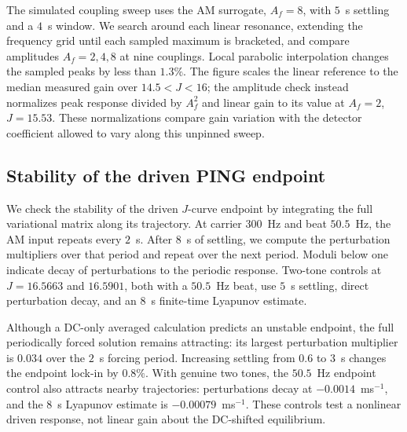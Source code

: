\documentclass[11pt,a4paper]{article}
\begin{document}
The simulated coupling sweep uses the AM surrogate, $A_f=8$, with $5$~s
settling and a $4$~s window. We search around each linear resonance, extending
the frequency grid until each sampled maximum is bracketed, and compare
amplitudes $A_f=2,4,8$ at nine couplings. Local parabolic interpolation changes
the sampled peaks by less than $1.3\%$. The figure scales the linear reference
to the median measured gain over $14.5<J<16$; the amplitude check instead
normalizes peak response divided by $A_f^2$ and linear gain to its value at
$A_f=2$, $J=15.53$. These normalizations compare gain variation with the detector coefficient
allowed to vary along this unpinned sweep.


\fi

\subsection{Stability of the driven PING endpoint}\label{app:ping-stability}
We check the stability of the driven $J$-curve endpoint by integrating the full
variational matrix along its trajectory. At carrier $300$~Hz and beat $50.5$~Hz,
the AM input repeats every $2$~s. After $8$~s of settling, we compute the
perturbation multipliers over that period and repeat over the next period.
Moduli below one indicate decay of perturbations to the periodic response.
Two-tone controls at $J=16.5663$ and $16.5901$, both with a $50.5$~Hz beat,
use $5$~s settling, direct perturbation decay, and an $8$~s finite-time
Lyapunov estimate.

Although a DC-only averaged calculation predicts an unstable endpoint, the full
periodically forced solution remains attracting: its largest perturbation
multiplier is $0.034$ over the $2$~s forcing period. Increasing settling from
$0.6$ to $3$~s changes the endpoint lock-in by $0.8\%$. With genuine two tones,
the $50.5$~Hz endpoint control also attracts nearby trajectories: perturbations
decay at $-0.0014$~ms$^{-1}$, and the $8$~s Lyapunov estimate is
$-0.00079$~ms$^{-1}$. These controls test a nonlinear driven response, not linear
gain about the DC-shifted equilibrium.
\end{document}
